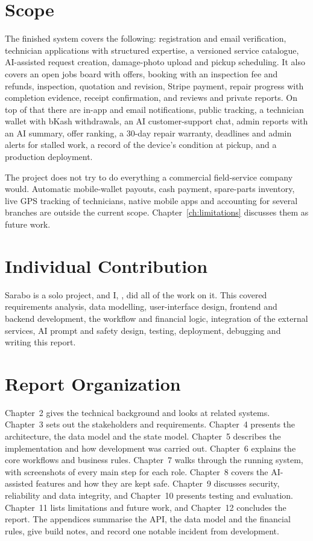\documentclass{standalone}
\begin{document}
\section{Scope}
The finished system covers the following: registration and email verification, technician applications with structured expertise, a versioned service catalogue, AI-assisted request creation, damage-photo upload and pickup scheduling. It also covers an open jobs board with offers, booking with an inspection fee and refunds, inspection, quotation and revision, Stripe payment, repair progress with completion evidence, receipt confirmation, and reviews and private reports. On top of that there are in-app and email notifications, public tracking, a technician wallet with bKash withdrawals, an AI customer-support chat, admin reports with an AI summary, offer ranking, a 30-day repair warranty, deadlines and admin alerts for stalled work, a record of the device's condition at pickup, and a production deployment.

The project does not try to do everything a commercial field-service company would. Automatic mobile-wallet payouts, cash payment, spare-parts inventory, live GPS tracking of technicians, native mobile apps and accounting for several branches are outside the current scope. Chapter~\ref{ch:limitations} discusses them as future work.

\section{Individual Contribution}
Sarabo is a solo project, and I, \studentname, did all of the work on it. This covered requirements analysis, data modelling, user-interface design, frontend and backend development, the workflow and financial logic, integration of the external services, AI prompt and safety design, testing, deployment, debugging and writing this report.

\section{Report Organization}
Chapter~2 gives the technical background and looks at related systems. Chapter~3 sets out the stakeholders and requirements. Chapter~4 presents the architecture, the data model and the state model. Chapter~5 describes the implementation and how development was carried out. Chapter~6 explains the core workflows and business rules. Chapter~7 walks through the running system, with screenshots of every main step for each role. Chapter~8 covers the AI-assisted features and how they are kept safe. Chapter~9 discusses security, reliability and data integrity, and Chapter~10 presents testing and evaluation. Chapter~11 lists limitations and future work, and Chapter~12 concludes the report. The appendices summarise the API, the data model and the financial rules, give build notes, and record one notable incident from development.
\end{document}
